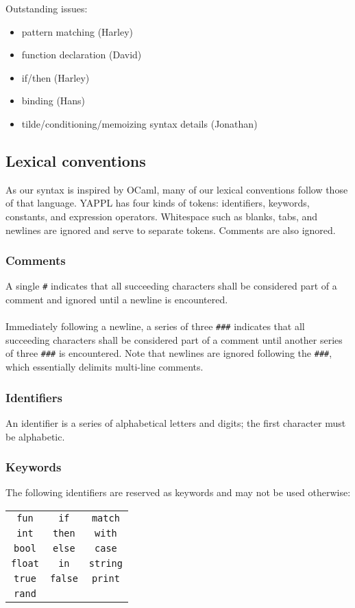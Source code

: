 
Outstanding issues:
\begin{itemize}
\item pattern matching (Harley)
\item function declaration (David)
\item if/then (Harley)
\item binding (Hans)
\item tilde/conditioning/memoizing syntax details (Jonathan)
\end{itemize}

\subsection{Lexical conventions}

As our syntax is inspired by OCaml, many of our lexical conventions follow those of that language. YAPPL has four kinds of tokens: identifiers, keywords, constants, and expression operators. Whitespace such as blanks, tabs, and newlines are ignored and serve to separate tokens. Comments are also ignored.

\subsubsection{Comments}

A single \texttt{\#} indicates that all succeeding characters shall be considered part of a comment and ignored until a newline is encountered. \\
\\
Immediately following a newline, a series of three \texttt{\#\#\#} indicates that all succeeding characters shall be considered part of a comment until another series of three \texttt{\#\#\#} is encountered. Note that newlines are ignored following the \texttt{\#\#\#}, which essentially delimits multi-line comments.

\subsubsection{Identifiers}

An identifier is a series of alphabetical letters and digits; the first character must be alphabetic. 

\subsubsection{Keywords}

The following identifiers are reserved as keywords and may not be used otherwise:
\begin{table}[htdp]
\center
\begin{tabular}{c c c}
\texttt{fun} & \texttt{if} &\texttt{match} \\
\texttt{int} & \texttt{then} & \texttt{with} \\
\texttt{bool} & \texttt{else} &\texttt{case} \\
\texttt{float} & \texttt{in} & \texttt{string} \\
\texttt{true} & \texttt{false} & \texttt{print} \\
 \texttt{rand}
\end{tabular}
\label{default}
\end{table}%

